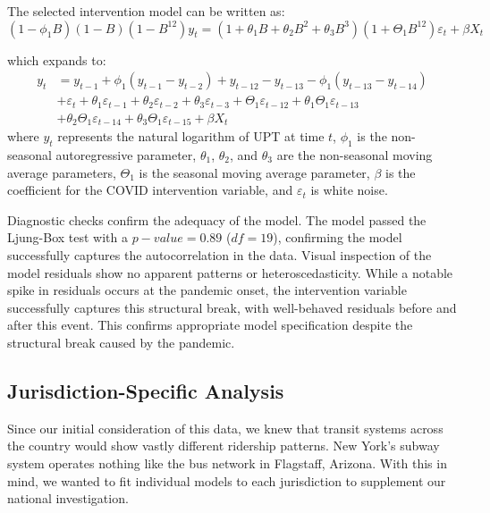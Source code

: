 \documentclass[11pt]{article}
\begin{document}
The selected intervention model can be written as:
\begin{equation}
(1 - \phi_1 B)(1 - B)(1 - B^{12})y_t = (1 + \theta_1 B + \theta_2 B^2 + \theta_3 B^3)(1 + \Theta_1 B^{12})\varepsilon_t + \beta X_t
\end{equation}

which expands to:
\begin{equation}
\begin{split}
y_t &= y_{t-1} + \phi_1(y_{t-1} - y_{t-2}) + y_{t-12} - y_{t-13} - \phi_1(y_{t-13} - y_{t-14}) \\
&+ \varepsilon_t + \theta_1\varepsilon_{t-1} + \theta_2\varepsilon_{t-2} + \theta_3\varepsilon_{t-3} + \Theta_1\varepsilon_{t-12} + \theta_1\Theta_1\varepsilon_{t-13} \\
&+ \theta_2\Theta_1\varepsilon_{t-14} + \theta_3\Theta_1\varepsilon_{t-15} + \beta X_t
\end{split}
\end{equation}
where $y_t$ represents the natural logarithm of UPT at time $t$, $\phi_1$ is the non-seasonal autoregressive parameter, $\theta_1$, $\theta_2$, and $\theta_3$ are the non-seasonal moving average parameters, $\Theta_1$ is the seasonal moving average parameter, $\beta$ is the coefficient for the COVID intervention variable, and $\varepsilon_t$ is white noise.

Diagnostic checks confirm the adequacy of the model. The model passed the Ljung-Box test with a $p-value = 0.89$ ($df = 19$), confirming the model successfully captures the autocorrelation in the data. Visual inspection of the model residuals show no apparent patterns or heteroscedasticity. While a notable spike in residuals occurs at the pandemic onset, the intervention variable successfully captures this structural break, with well-behaved residuals before and after this event. This confirms appropriate model specification despite the structural break caused by the pandemic.

\subsection{Jurisdiction-Specific Analysis}

Since our initial consideration of this data, we knew that transit systems across the country would show vastly different ridership patterns. New York's subway system operates nothing like the bus network in Flagstaff, Arizona. With this in mind, we wanted to fit individual models to each jurisdiction to supplement our national investigation.
\end{document}
